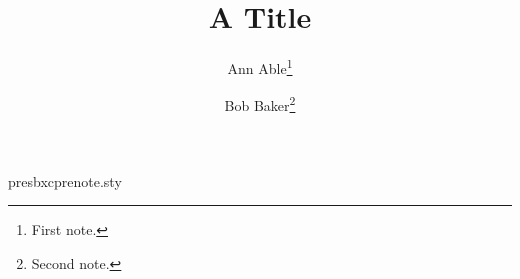 \begin{filecontents*}[overwrite]{presbxcprenote.sty}
\renewcommand\maketitle{\begingroup\footnote{Preprint under review.}\begin{center}{\LARGE\@title}\par\begin{tabular}[t]{c}\@author\end{tabular}\end{center}\@thanks\endgroup}
\end{filecontents*}
\documentclass{article}
\usepackage{presbxcprenote}
\makeatletter{}\makeatother
\title{A Title}
\author{Ann Able\thanks{First note.} \and Bob Baker\thanks{Second note.}}

\maketitle
Body.

